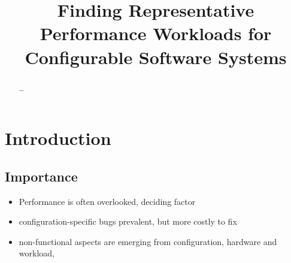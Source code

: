 \documentclass[conference]{IEEEtran}
\begin{document}
\title{Finding Representative Performance Workloads for Configurable Software Systems}

\author{

\and
{}
}
\maketitle

\begin{abstract}
\ldots
\end{abstract}


\section{Introduction}

\subsection{Importance}
\begin{itemize}
	\item Performance is often overlooked, deciding factor
	\item configuration-specific bugs prevalent, but more costly to fix\cite{han_empirical_2016}
	\item non-functional aspects are emerging from configuration, hardware and workload, 
\end{itemize}
\end{document}
